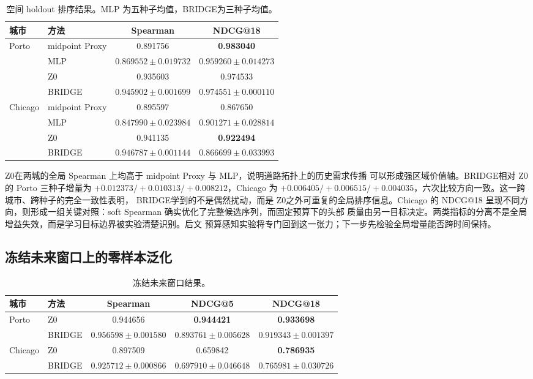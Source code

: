 \documentclass[UTF8,a4paper,10pt,twocolumn]{ctexart}
\newenvironment{paperwidetable}{\begin{table}[t]}{\end{table}}
\newenvironment{paperwidetable}{\begin{table}[H]}{\end{table}}
\newcommand{\zmethod}{Z0}
\newcommand{\gmethod}{BRIDGE}
\begin{document}
\begin{paperwidetable}
  \centering
  \footnotesize
  \caption{空间 holdout 排序结果。MLP 为五种子均值，\gmethod 为三种子均值。}
  \label{tab:holdout}
  \begin{tabular}{llcc}
    \toprule
    城市 & 方法 & Spearman & NDCG@18 \\
    \midrule
    Porto & midpoint Proxy & 0.891756 & \textbf{0.983040} \\
           & MLP & $0.869552\pm0.019732$ & $0.959260\pm0.014273$ \\
           & \zmethod & 0.935603 & 0.974533 \\
           & \gmethod & $\mathbf{0.945902\pm0.001699}$ & $0.974551\pm0.000110$ \\
    \midrule
    Chicago & midpoint Proxy & 0.895597 & 0.867650 \\
            & MLP & $0.847990\pm0.023984$ & $0.901271\pm0.028814$ \\
            & \zmethod & 0.941135 & \textbf{0.922494} \\
            & \gmethod & $\mathbf{0.946787\pm0.001144}$ & $0.866699\pm0.033993$ \\
    \bottomrule
  \end{tabular}
\end{paperwidetable}

\zmethod 在两城的全局 Spearman 上均高于 midpoint Proxy 与 MLP，说明道路拓扑上的历史需求传播
可以形成强区域价值轴。\gmethod 相对 \zmethod 的 Porto 三种子增量为
$+0.012373/+0.010313/+0.008212$，Chicago 为
$+0.006405/+0.006515/+0.004035$，六次比较方向一致。这一跨城市、跨种子的完全一致性表明，
\gmethod 学到的不是偶然扰动，而是 \zmethod 之外可重复的全局排序信息。Chicago 的 NDCG@18
呈现不同方向，则形成一组关键对照：soft Spearman 确实优化了完整候选序列，而固定预算下的头部
质量由另一目标决定。两类指标的分离不是全局增益失效，而是学习目标边界被实验清楚识别。后文
预算感知实验将专门回到这一张力；下一步先检验全局增量能否跨时间保持。

\subsection{冻结未来窗口上的零样本泛化}

\begin{paperwidetable}
  \centering
  \footnotesize
  \caption{冻结未来窗口结果。}
  \label{tab:future}
  \begin{tabular}{llccc}
    \toprule
    城市 & 方法 & Spearman & NDCG@5 & NDCG@18 \\
    \midrule
    Porto & \zmethod & 0.944656 & \textbf{0.944421} & \textbf{0.933698} \\
           & \gmethod & $\mathbf{0.956598\pm0.001580}$ & $0.893761\pm0.005628$ & $0.919343\pm0.001397$ \\
    \midrule
    Chicago & \zmethod & 0.897509 & 0.659842 & \textbf{0.786935} \\
            & \gmethod & $\mathbf{0.925712\pm0.000866}$ & $\mathbf{0.697910\pm0.046648}$ & $0.765981\pm0.030726$ \\
    \bottomrule
  \end{tabular}
\end{paperwidetable}
\end{document}
